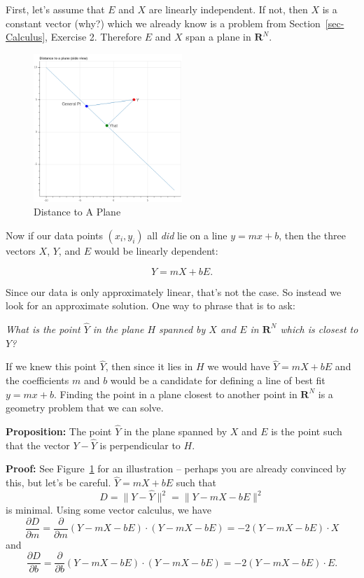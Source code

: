 \documentclass[
  11pt,
  letterpaper,
]{scrbook}
\theoremstyle{plain}
\theoremstyle{plain}
\theoremstyle{remark}
\begin{document}
First, let's assume that \(E\) and \(X\) are linearly independent. If
not, then \(X\) is a constant vector (why?) which we already know is a
problem from Section~\ref{sec-Calculus}, Exercise 2. Therefore \(E\) and
\(X\) span a plane in \(\mathbf{R}^{N}\).

\begin{figure}

{\centering \includegraphics[width=0.5\textwidth,height=\textheight]{chapters/img/distance-to-plane.png}

}

\caption{\label{fig-perp}Distance to A Plane}

\end{figure}

Now if our data points \((x_i,y_i)\) all \emph{did} lie on a line
\(y=mx+b\), then the three vectors \(X\), \(Y\), and \(E\) would be
linearly dependent:

\[ Y = mX + bE.  \]

Since our data is only approximately linear, that's not the case. So
instead we look for an approximate solution. One way to phrase that is
to ask:

\emph{What is the point \(\hat{Y}\) in the plane \(H\) spanned by \(X\)
and \(E\) in \(\mathbf{R}^{N}\) which is closest to \(Y\)?}

If we knew this point \(\hat{Y}\), then since it lies in \(H\) we would
have \(\hat{Y}=mX+bE\) and the coefficients \(m\) and \(b\) would be a
candidate for defining a line of best fit \(y=mx+b\). Finding the point
in a plane closest to another point in \(\mathbf{R}^{N}\) is a geometry
problem that we can solve.

\textbf{Proposition:} The point \(\hat{Y}\) in the plane spanned by
\(X\) and \(E\) is the point such that the vector \(Y-\hat{Y}\) is
perpendicular to \(H\).

\textbf{Proof:} See Figure~\ref{fig-perp} for an illustration -- perhaps
you are already convinced by this, but let's be careful.
\(\hat{Y}=mX+bE\) such that \[ D = \|Y-\hat{Y}\|^2 = \|Y-mX-bE\|^2 \] is
minimal. Using some vector calculus, we have
\[ \frac{\partial D}{\partial m} =
\frac{\partial}{\partial m} (Y-mX-bE)\cdot (Y-mX-bE) =
-2(Y-mX-bE)\cdot X \] and \[ \frac{\partial D}{\partial b} =
\frac{\partial}{\partial b} (Y-mX-bE)\cdot (Y-mX-bE) =
-2(Y-mX-bE)\cdot E.  \]
\end{document}
